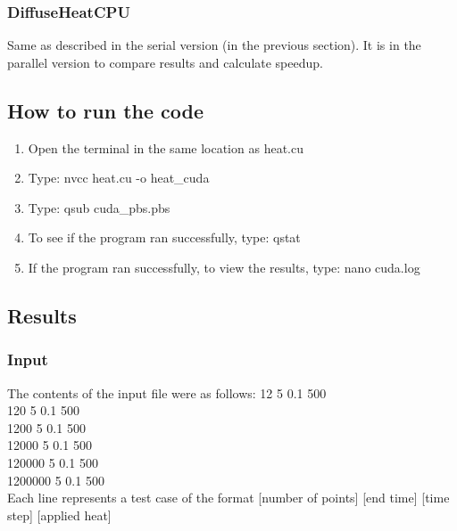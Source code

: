 \documentclass{article}
\begin{document}
\subsubsection{DiffuseHeatCPU}
Same as described in the serial version (in the previous section). It is in the parallel version to compare results and calculate speedup.

\subsection{How to run the code}
\begin{enumerate}
	\item Open the terminal in the same location as heat.cu
	\item Type: nvcc heat.cu -o heat\_cuda
	\item Type: qsub cuda\_pbs.pbs
	\item To see if the program ran successfully, type: qstat
	\item If the program ran successfully, to view the results, type: nano cuda.log
\end{enumerate}

\subsection{Results}
\subsubsection{Input}
	The contents of the input file were as follows:
	12 5 0.1 500\\
	120 5 0.1 500\\
	1200 5 0.1 500\\
	12000 5 0.1 500\\
	120000 5 0.1 500\\
	1200000 5 0.1 500\\
	Each line represents a test case of the format [number of points] [end time] [time step] [applied heat]
\end{document}
